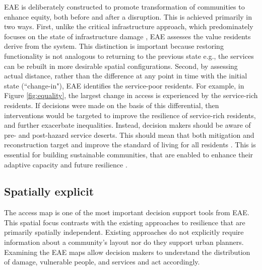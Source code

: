 \documentclass[onecolumn,doublespacing]{risa}
\let \cite \parencite
\begin{document}
EAE is deliberately constructed to promote transformation of communities to enhance equity, both before and after a disruption. 
This is achieved primarily in two ways.
First, unlike the critical infrastructure approach, which predominately focuses on the state of infrastructure damage \cite{Cutter2010-vg}, EAE assesses the value residents derive from the system. 
This distinction is important because restoring functionality is not analogous to returning to the previous state e.g., the services can be rebuilt in more desirable spatial configurations.
Second, by assessing actual distance, rather than the difference at any point in time with the initial state (``change-in"), EAE identifies the service-poor residents. 
For example, in Figure \ref{fig:equality}, the largest change in access is experienced by the service-rich residents.
If decisions were made on the basis of this differential, then interventions would be targeted to improve the resilience of service-rich residents, and further exacerbate inequalities.
Instead, decision makers should be aware of pre- and post-hazard service deserts. 
This should mean that both mitigation and reconstruction target and improve the standard of living for all residents \cite{Pantelic1991-qu}. 
This is essential for building sustainable communities, that are enabled to enhance their adaptive capacity and future resilience \cite{Saunders2015-uz}.

\subsection{Spatially explicit}
The access map is one of the most important decision support tools from EAE.
This spatial focus contrasts with the existing approaches to resilience that are primarily spatially independent.
Existing approaches do not explicitly require information about a community's layout nor do they support urban planners. 
Examining the EAE maps allow decision makers to understand the distribution of damage, vulnerable people, and services and act accordingly.
\end{document}
